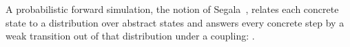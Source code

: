 \begin{definition}
  \label{def:forwardsim}
  \leanok
  A probabilistic forward simulation, the notion of Segala~\cite{Segala95}, relates each concrete state to a distribution over abstract states and answers every concrete step by a weak transition out of that distribution under a coupling: .
\end{definition}
